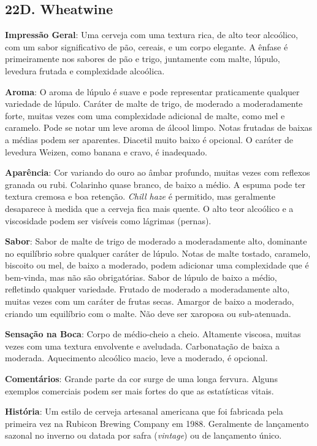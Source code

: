 \subsection*{22D. Wheatwine}
\textbf{Impressão Geral}: Uma cerveja com uma textura rica, de alto teor alcoólico, com um sabor significativo de pão, cereais, e um corpo elegante. A ênfase é primeiramente nos sabores de pão e trigo, juntamente com malte, lúpulo, levedura frutada e complexidade alcoólica.

\textbf{Aroma}: O aroma de lúpulo é suave e pode representar praticamente qualquer variedade de lúpulo. Caráter de malte de trigo, de moderado a moderadamente forte, muitas vezes com uma complexidade adicional de malte, como mel e caramelo. Pode se notar um leve aroma de álcool limpo. Notas frutadas de baixas a médias podem ser aparentes. Diacetil muito baixo é opcional. O caráter de levedura Weizen, como banana e cravo, é inadequado.

\textbf{Aparência}: Cor variando do ouro ao âmbar profundo, muitas vezes com reflexos granada ou rubi. Colarinho quase branco, de baixo a médio. A espuma pode ter textura cremosa e boa retenção. \textit{Chill haze} é permitido, mas geralmente desaparece à medida que a cerveja fica mais quente. O alto teor alcoólico e a viscosidade podem ser visíveis como lágrimas (pernas).

\textbf{Sabor}: Sabor de malte de trigo de moderado a moderadamente alto, dominante no equilíbrio sobre qualquer caráter de lúpulo. Notas de malte tostado, caramelo, biscoito ou mel, de baixo a moderado, podem adicionar uma complexidade que é bem-vinda, mas não são obrigatórias. Sabor de lúpulo de baixo a médio, refletindo qualquer variedade. Frutado de moderado a moderadamente alto, muitas vezes com um caráter de frutas secas. Amargor de baixo a moderado, criando um equilíbrio com o malte. Não deve ser xaroposa ou sub-atenuada.

\textbf{Sensação na Boca}: Corpo de médio-cheio a cheio. Altamente viscosa, muitas vezes com uma textura envolvente e aveludada. Carbonatação de baixa a moderada. Aquecimento alcoólico macio, leve a moderado, é opcional.

\textbf{Comentários}: Grande parte da cor surge de uma longa fervura. Alguns exemplos comerciais podem ser mais fortes do que as estatísticas vitais.

\textbf{História}: Um estilo de cerveja artesanal americana que foi fabricada pela primeira vez na Rubicon Brewing Company em 1988. Geralmente de lançamento sazonal no inverno ou datada por safra (\textit{vintage}) ou de lançamento único.

